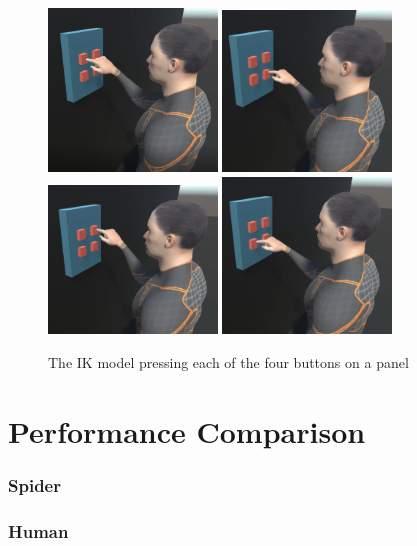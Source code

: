 \begin{figure}[h!]
    \centering
    \captionsetup{justification=centering}
    \includegraphics[width=0.4\textwidth]{grafika/h_ik_1.png}
    \includegraphics[width=0.4\textwidth]{grafika/h_ik_2.png}
    \includegraphics[width=0.4\textwidth]{grafika/h_ik_3.png}
    \includegraphics[width=0.4\textwidth]{grafika/h_ik_4.png}
    \caption{The IK model pressing each of the four buttons on a panel}
    \label{fig:h_ik_multiple}
\end{figure}



\section{Performance Comparison}

\subsubsection{Spider}
\subsubsection{Human}
